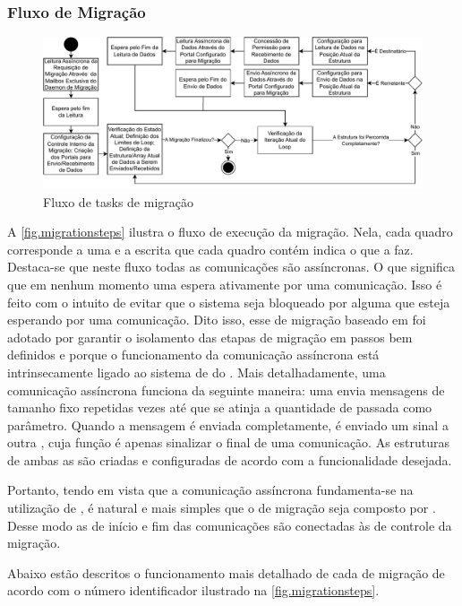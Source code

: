 \subsubsection{Fluxo de Migração}

\begin{figure}[bt]
    \centering
    \includegraphics[width=\linewidth]{content/images/migration-steps-tasks.pdf}
    \caption{Fluxo de tasks de migração}
    \label{fig.migrationsteps}
\end{figure}

A \autoref{fig.migrationsteps} ilustra o fluxo de execução da migração. Nela, cada quadro corresponde a uma \task e a escrita que cada quadro contém indica o que a \task faz. Destaca-se que neste fluxo todas as comunicações são assíncronas. O que significa que em nenhum momento uma \task espera ativamente por uma comunicação. Isso é feito com o intuito de evitar que o sistema seja bloqueado por alguma \task que esteja esperando por uma comunicação. Dito isso, esse \design de migração baseado em \tasks foi adotado por garantir o isolamento das etapas de migração em passos bem definidos e porque o funcionamento da comunicação assíncrona está intrinsecamente ligado ao sistema de \tasks do \nanvix. Mais detalhadamente, uma comunicação assíncrona funciona da seguinte maneira: uma \task envia mensagens de tamanho fixo repetidas vezes até que se atinja a quantidade de \bytes passada como parâmetro. Quando a mensagem é enviada completamente, é enviado um sinal a outra \task, cuja função é apenas sinalizar o final de uma comunicação. As estruturas de ambas as \tasks são criadas e configuradas de acordo com a funcionalidade desejada.

Portanto, tendo em vista que a comunicação assíncrona fundamenta-se na utilização de \tasks, é natural e mais simples que o \daemon de migração seja composto por \tasks. Desse modo as \tasks de início e fim das comunicações são conectadas às \tasks de controle da migração.

Abaixo estão descritos o funcionamento mais detalhado de cada \task de migração de acordo com o número identificador ilustrado na \autoref{fig.migrationsteps}.



